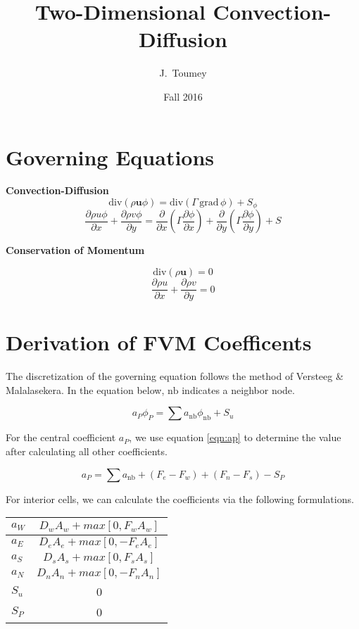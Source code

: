 \documentclass{article}
\title{Two-Dimensional Convection-Diffusion}
\author{J.\ Toumey}
\date{Fall 2016}
\newcommand{\DA}[1]{D_{#1} A_{#1}}
\newcommand{\FA}[1]{F_{#1} A_{#1}}
\newcommand{\dby}[2]{\frac{\partial #1}{\partial #2}}
\newcommand{\lp}{\left(}
\newcommand{\rp}{\right)}
\newcommand{\divc}[1]{\mathrm{div}\!\left(#1\right)}
\begin{document}
\maketitle


\section{Governing Equations}
\textbf{Convection-Diffusion}
\begin{equation}
   \divc{\rho \mathbf{u} \phi} = \divc{\Gamma \, \mathrm{grad}\, \phi} + S_{\phi}
\end{equation}
\begin{equation}
   \dby{\rho u \phi}{x} + \dby{\rho v \phi}{y} = \dby{}{x} \lp \Gamma \dby{\phi}{x} \rp + \dby{}{y} \lp \Gamma \dby{\phi}{y} \rp + S
\end{equation}

\textbf{Conservation of Momentum}

\begin{equation}
   \divc{\rho \mathbf{u}} = 0
\end{equation}
\begin{equation}
   \dby{\rho u}{x} + \dby{\rho v}{y} = 0
\end{equation}

\section{Derivation of FVM Coefficents}
The discretization of the governing equation follows the method of Versteeg \& Malalasekera.
In the equation below, $\mathrm{nb}$ indicates a neighbor node. 

\begin{equation}
   a_P \phi_P = \sum a_{\mathrm{nb}} \phi_{\mathrm{nb}} + S_u
\end{equation}

For the central coefficient $a_P$, we use equation \ref{eqn:ap} to determine the value after calculating all other coefficients.

\begin{equation}
   a_P = \sum a_{\mathrm{nb}} + \lp F_e - F_w \rp + \lp F_n - F_s \rp - S_P
   \label{eqn:ap}
\end{equation}

For interior cells, we can calculate the coefficients via the following formulations.
\begin{table}[!ht]
\centering
\begin{tabular}{|l|c|} \hline
   $a_W$ & $\DA{w} + max\left[0,  \FA{w}\right]$ \\ \hline
   $a_E$ & $\DA{e} + max\left[0, -\FA{e}\right]$ \\ \hline
   $a_S$ & $\DA{s} + max\left[0,  \FA{s}\right]$ \\ \hline
   $a_N$ & $D_n A_n + max\left[0, -F_n A_n\right]$ \\ \hline
   $S_u$ & 0 \\ \hline
   $S_P$ & 0 \\ \hline
\end{tabular}
\end{table}
\end{document}
